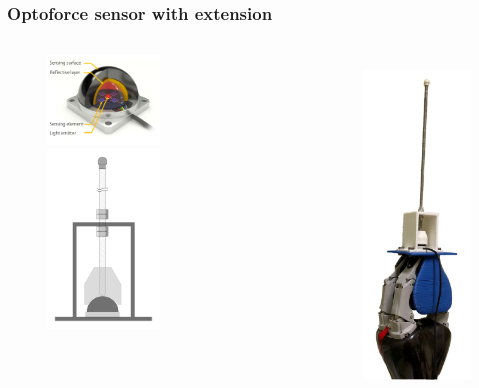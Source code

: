 \documentclass{beamer}
\begin{document}
\begin{frame}
  \frametitle{Optoforce sensor with extension}
  
  \begin{columns}[T]
    \begin{column}{0.39\textwidth}
      \begin{figure}[htp]
        \centering
        \includegraphics[width=3cm]{OMD-xsec.png}

        \includegraphics[width=3cm]{otpo_frame.pdf}
      \end{figure}
    \end{column}
  
    \begin{column}{0.6\textwidth}
      \vspace{-0.8cm}
      \begin{figure}[htp]
        \centering
        \includegraphics[height=9cm, angle=-30]{photo/tool.jpg}
      \end{figure}
    \end{column}
  \end{columns}
\end{frame}
\end{document}
